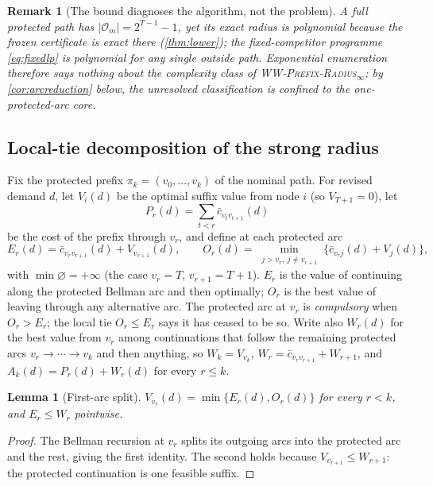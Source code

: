 \documentclass[11pt]{article}
\newtheorem{lemma}[theorem]{Lemma}
\newtheorem{remark}[theorem]{Remark}
\theoremstyle{definition}
\newcommand{\cO}{\mathcal{O}}
\newcommand{\WWR}{\textsc{WW-Prefix-Radius}\ensuremath{_{\infty}}}
\begin{document}
\begin{remark}[The bound diagnoses the algorithm, not the problem]\label{rem:algnotproblem}
A full protected path has $\lvert\cO_m\rvert=2^{T-1}-1$, yet its exact
radius is polynomial because the frozen certificate is exact there
(\cref{thm:lower}); the fixed-competitor programme \eqref{eq:fixedlp} is
polynomial for any single outside path. Exponential enumeration therefore
says nothing about the complexity class of \WWR{}; by
\cref{cor:arcreduction} below, the unresolved classification is confined
to the one-protected-arc core.
\end{remark}

\subsection{Local-tie decomposition of the strong radius}\label{sec:decomposition}

Fix the protected prefix $\pi_k=(v_0,\ldots,v_k)$ of the nominal path.
For revised demand $d$, let $V_i(d)$ be the optimal suffix value from
node $i$ (so $V_{T+1}=0$), let
\[
P_r(d)=\sum_{t<r}\bar c_{v_tv_{t+1}}(d)
\]
be the cost of the prefix through $v_r$, and define at each protected arc
\[
E_r(d)=\bar c_{v_rv_{r+1}}(d)+V_{v_{r+1}}(d),
\qquad
O_r(d)=\min_{\substack{j>v_r,\ j\ne v_{r+1}}}
\bigl\{\bar c_{v_rj}(d)+V_j(d)\bigr\},
\]
with $\min\varnothing=+\infty$ (the case $v_r=T$, $v_{r+1}=T+1$).
$E_r$ is the value of continuing along the protected Bellman arc and then
optimally; $O_r$ is the best value of leaving through any alternative
arc. The protected arc at $v_r$ is \emph{compulsory} when $O_r>E_r$;
the local tie $O_r\le E_r$ says it has ceased to be so. Write also
$W_r(d)$ for the best value from $v_r$ among continuations that follow
the remaining protected arcs $v_r\to\cdots\to v_k$ and then anything, so
$W_k=V_{v_k}$, $W_r=\bar c_{v_rv_{r+1}}+W_{r+1}$, and
$A_k(d)=P_r(d)+W_r(d)$ for every $r\le k$.

\begin{lemma}[First-arc split]\label{lem:firstarc}
$V_{v_r}(d)=\min\{E_r(d),O_r(d)\}$ for every $r<k$, and
$E_r\le W_r$ pointwise.
\end{lemma}

\begin{proof}
The Bellman recursion at $v_r$ splits its outgoing arcs into the
protected arc and the rest, giving the first identity. The second holds
because $V_{v_{r+1}}\le W_{r+1}$: the protected continuation is one
feasible suffix.
\end{proof}
\end{document}
